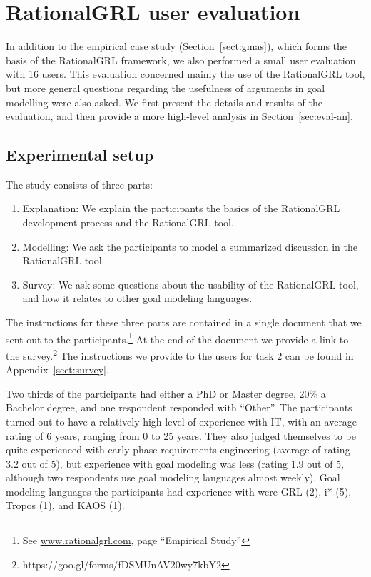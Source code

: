 \section{RationalGRL user evaluation}
\label{sect:validation}

In addition to the empirical case study (Section~\ref{sect:gmas}), which forms the basis of the RationalGRL framework, we also performed a small user evaluation with 16 users. This evaluation concerned  mainly the use of the RationalGRL tool, but more general questions regarding the usefulness of arguments in goal modelling were also asked. We first present the details and results of the evaluation, and then provide a more high-level analysis in Section~\ref{sec:eval-an}.

\subsection{Experimental setup}
The study consists of three parts:
\begin{enumerate}
\item Explanation: We explain the participants the basics of the RationalGRL development process and the RationalGRL tool.
\item Modelling: We ask the participants to model a summarized discussion in the RationalGRL tool.
\item Survey: We ask some questions about the usability of the RationalGRL tool, and how it relates to other goal modeling languages.
\end{enumerate}

The instructions for these three parts are contained in a single document that we sent out to the participants.\footnote{See \url{www.rationalgrl.com}, page ``Empirical Study''} At the end of the document we provide a link to the survey.\footnote{https://goo.gl/forms/fDSMUnAV20wy7kbY2} The instructions we provide to the users for task 2 can be found in Appendix~\ref{sect:survey}.

Two thirds of the participants had either a PhD or Master degree, 20\% a Bachelor degree, and one respondent responded with ``Other''. The participants turned out to have a relatively high level of experience with IT, with an average rating of 6 years, ranging from 0 to 25 years. They also judged themselves to be quite experienced with early-phase requirements engineering (average of rating 3.2 out of 5), but experience with goal modeling was less (rating 1.9 out of 5, although two respondents use goal modeling languages almost weekly). Goal modeling languages the participants had experience with were GRL (2), i* (5), Tropos (1), and KAOS (1).

